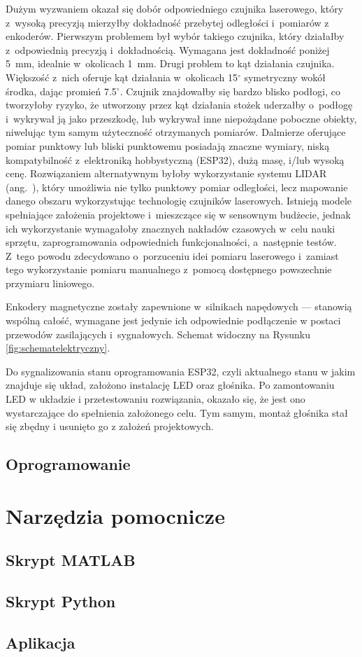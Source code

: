 Dużym wyzwaniem okazał się dobór odpowiedniego czujnika laserowego, który z~wysoką precyzją mierzyłby dokładność przebytej odległości i~pomiarów z enkoderów. Pierwszym problemem był wybór takiego czujnika, który działałby z~odpowiednią precyzją i~dokładnością. Wymagana jest dokładność poniżej 5~mm, idealnie w~okolicach 1~mm. Drugi problem to kąt działania czujnika. Większość z~nich oferuje kąt działania w~okolicach 15$^{\circ}$ symetryczny wokół środka, dając promień 7.5$^{\circ}$. Czujnik znajdowałby się bardzo blisko podłogi, co tworzyłoby ryzyko, że utworzony przez kąt działania stożek uderzałby o~podłogę i~wykrywał ją jako przeszkodę, lub wykrywał inne niepożądane poboczne obiekty, niwelując tym samym użyteczność otrzymanych pomiarów. Dalmierze oferujące pomiar punktowy lub bliski punktowemu posiadają znaczne wymiary, niską kompatybilność z~elektroniką hobbystyczną (ESP32), dużą masę, i/lub wysoką cenę. Rozwiązaniem alternatywnym byłoby wykorzystanie systemu LIDAR (ang.~), który umożliwia nie tylko punktowy pomiar odległości, lecz mapowanie danego obszaru wykorzystując technologię czujników laserowych. Istnieją modele spełniające założenia projektowe i~mieszczące się w sensownym budżecie, jednak ich wykorzystanie wymagałoby znacznych nakładów czasowych w~celu nauki sprzętu, zaprogramowania odpowiednich funkcjonalności, a~następnie testów. Z~tego powodu zdecydowano o~porzuceniu idei pomiaru laserowego i~zamiast tego wykorzystanie pomiaru manualnego z~pomocą dostępnego powszechnie przymiaru liniowego.

Enkodery magnetyczne zostały zapewnione w~silnikach napędowych --- stanowią wspólną całość, wymagane jest jedynie ich odpowiednie podłączenie w postaci przewodów zasilających i~sygnałowych. Schemat widoczny na Rysunku \ref{fig:schematelektryczny}.

Do sygnalizowania stanu oprogramowania ESP32, czyli aktualnego stanu w jakim znajduje się układ, założono instalację LED oraz głośnika. Po zamontowaniu LED w układzie i przetestowaniu rozwiązania, okazało się, że jest ono wystarczające do spełnienia założonego celu. Tym samym, montaż głośnika stał się zbędny i usunięto go z założeń projektowych.



\subsection*{Oprogramowanie}


\section{Narzędzia pomocnicze}

\subsection*{Skrypt MATLAB}

\subsection*{Skrypt Python}

\subsection*{Aplikacja}